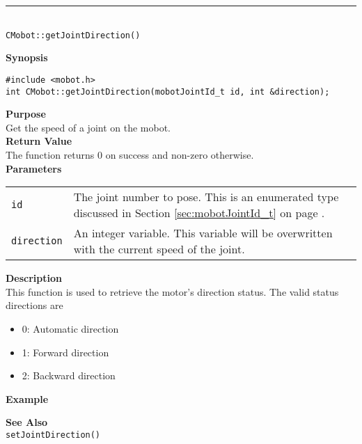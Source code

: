 \noindent
\vspace{5pt}
\rule{4.5in}{0.015in}\\
\noindent
{\LARGE \texttt{CMobot::getJointDirection()}}\\
{}

\noindent
{\bf Synopsis}
\vspace{-8pt}
\begin{verbatim}
#include <mobot.h>
int CMobot::getJointDirection(mobotJointId_t id, int &direction);
\end{verbatim}

\noindent
{\bf Purpose}\\
Get the speed of a joint on the mobot.\\

\noindent
{\bf Return Value}\\
The function returns 0 on success and non-zero otherwise.\\

\noindent
{\bf Parameters}
\vspace{-0.1in}
\begin{description}
\item               
\begin{tabular}{p{10 mm}p{145 mm}}
\texttt{id} & The joint number to pose. This is an enumerated type 
discussed in Section \ref{sec:mobotJointId_t} on page
\pageref{sec:mobotJointId_t}.\\
\texttt{direction} & An integer variable. This variable will be overwritten
with the current speed of the joint.
\end{tabular}
\end{description}

\noindent
{\bf Description}\\
This function is used to retrieve the motor's direction status. The valid
status directions are
\begin{itemize}
\item 0: Automatic direction
\item 1: Forward direction
\item 2: Backward direction
\end{itemize}

\noindent
{\bf Example}\\
\noindent

\noindent
{\bf See Also}\\
\texttt{setJointDirection()}

